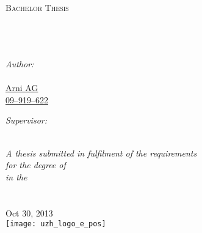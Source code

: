\documentclass[11pt, a4paper, oneside]{Thesis} %
\begin{document}
\begin{titlepage}
\begin{center}

\textsc{\LARGE \univname}\\[1.5cm] %
\textsc{\Large Bachelor Thesis}\\[0.5cm] %

\HRule \\[0.4cm] %
{\huge \bfseries \ttitle}\\[0.4cm] %
\HRule \\[1.5cm] %
 
\begin{minipage}{0.45\textwidth}
\begin{flushleft} \large
\emph{Author:}\\
\href{http://www.sleepy-robots.org}{\authornames \\ Arni AG \\ 09--919--622} %
\end{flushleft}
\end{minipage}
\begin{minipage}{0.45\textwidth}
\begin{flushright} \large
\emph{Supervisor:} \\
\href{http://www.ailab.ifi.uzh.ch}{\supname} %
\end{flushright}
\end{minipage}\\[3cm]
 
\large \textit{A thesis submitted in fulfilment of the requirements\\ for the degree of \degreename}\\[0.3cm] %
\textit{in the}\\[0.4cm]
\groupname\\\deptname\\[2cm] %
 
{\large Oct 30, 2013}\\[2.5cm] %
\texttt{[image: uzh\_logo\_e\_pos]} %
 
\vfill
\end{center}

\end{titlepage}

\end{document}
